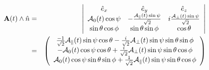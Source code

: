 \documentclass[a4paper,9pt,twoside]{article}
\begin{document}
\begin{eqnarray}
  { \bf A}(t) \wedge \hat{n} &=& \left|  \begin{array}{ccc}  
                                        \hat{e}_x & \hat{e}_y & \hat{e}_z \\
                                        {\cal A}_0(t) \cos\psi & - \frac{{\cal A}_\parallel(t) \sin\psi }{\sqrt{2}} & i\frac{ {\cal A}_\perp(t)\sin\psi}{\sqrt{2}}\\
                                        \sin\theta\cos\phi & \sin\theta\sin\phi & \cos\theta 
                                    \end{array}\right|  \\
                          &=& \left(\begin{array}{c}
                                  \frac{-1}{\sqrt{2}} {\cal A}_\parallel(t) \sin\psi \cos\theta  -  \frac{i }{\sqrt{2}}{\cal A}_\perp(t)\sin\psi\sin\theta\sin\phi  \\
                                   -{\cal A}_0(t) \cos\psi\cos\theta  + \frac{i}{\sqrt{2}} {\cal A}_\perp(t)\sin\psi \sin\theta\cos\phi \\
                                   {\cal A}_0(t) \cos\psi \sin\theta\sin\phi       + \frac{1}{\sqrt{2}}{\cal A}_\parallel(t) \sin\psi \sin\theta\cos\phi 
                              \end{array} \right)
\end{eqnarray}
\end{document}
